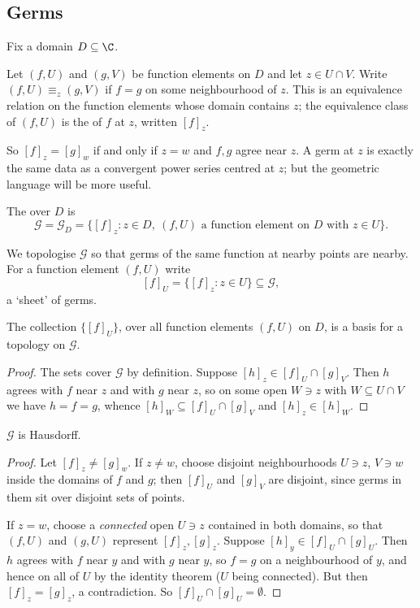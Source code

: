 \subsection{Germs}

Fix a domain $D \subseteq \C$.

\begin{definition}[Germ]
	Let $(f, U)$ and $(g, V)$ be function elements on $D$ and let $z \in U \cap V$. Write
	$(f,U) \equiv_z (g,V)$ if $f = g$ on some neighbourhood of $z$. This is an equivalence
	relation on the function elements whose domain contains $z$; the equivalence class of
	$(f,U)$ is the  of $f$ at $z$, written $[f]_z$.
\end{definition}

So $[f]_z = [g]_w$ if and only if $z = w$ and $f, g$ agree near $z$. A germ at $z$ is
exactly the same data as a convergent power series centred at $z$; but the geometric
language will be more useful.

\begin{definition}
	The  over $D$ is
	$$
	\mathcal{G} = \mathcal{G}_D = \{[f]_z : z \in D, \ (f,U) \text{ a function element on } D \text{ with } z \in U\}.
	$$
\end{definition}

We topologise $\mathcal{G}$ so that germs of the same function at nearby points are
nearby. For a function element $(f,U)$ write
$$
[f]_U = \{[f]_z : z \in U\} \subseteq \mathcal{G},
$$
a `sheet' of germs.

\begin{lemma}
	The collection $\{[f]_U\}$, over all function elements $(f,U)$ on $D$, is a basis for a
	topology on $\mathcal{G}$.
\end{lemma}

\begin{proof}
	The sets cover $\mathcal{G}$ by definition. Suppose $[h]_z \in [f]_U \cap [g]_V$. Then
	$h$ agrees with $f$ near $z$ and with $g$ near $z$, so on some open $W \ni z$ with
	$W \subseteq U \cap V$ we have $h = f = g$, whence
	$[h]_W \subseteq [f]_U \cap [g]_V$ and $[h]_z \in [h]_W$.
\end{proof}

\begin{lemma}\label{lem:germshausdorff}
	$\mathcal{G}$ is Hausdorff.
\end{lemma}

\begin{proof}
	Let $[f]_z \neq [g]_w$. If $z \neq w$, choose disjoint neighbourhoods $U \ni z$,
	$V \ni w$ inside the domains of $f$ and $g$; then $[f]_U$ and $[g]_V$ are disjoint,
	since germs in them sit over disjoint sets of points.

	If $z = w$, choose a \emph{connected} open $U \ni z$ contained in both domains, so that
	$(f, U)$ and $(g,U)$ represent $[f]_z, [g]_z$. Suppose $[h]_y \in [f]_U \cap [g]_U$.
	Then $h$ agrees with $f$ near $y$ and with $g$ near $y$, so $f = g$ on a neighbourhood
	of $y$, and hence on all of $U$ by the identity theorem ($U$ being connected). But then
	$[f]_z = [g]_z$, a contradiction. So $[f]_U \cap [g]_U = \emptyset$.
\end{proof}

